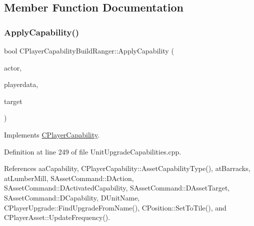 \subsection{Member Function Documentation}
\hypertarget{classCPlayerCapabilityBuildRanger_a113a97c3d833f206d333cb0e2e37aa31}{}\label{classCPlayerCapabilityBuildRanger_a113a97c3d833f206d333cb0e2e37aa31} 
\subsubsection{\texorpdfstring{Apply\+Capability()}{ApplyCapability()}}
{\footnotesize\ttfamily bool C\+Player\+Capability\+Build\+Ranger\+::\+Apply\+Capability (\begin{DoxyParamCaption}\item[{std\+::shared\+\_\+ptr$<$ \hyperlink{classCPlayerAsset}{C\+Player\+Asset} $>$}]{actor,  }\item[{std\+::shared\+\_\+ptr$<$ \hyperlink{classCPlayerData}{C\+Player\+Data} $>$}]{playerdata,  }\item[{std\+::shared\+\_\+ptr$<$ \hyperlink{classCPlayerAsset}{C\+Player\+Asset} $>$}]{target }\end{DoxyParamCaption})\hspace{0.3cm}{\ttfamily [virtual]}}



Implements \hyperlink{classCPlayerCapability_a2ca6fd7fbd9c0178f1cf1d049c63825f}{C\+Player\+Capability}.



Definition at line 249 of file Unit\+Upgrade\+Capabilities.\+cpp.



References aa\+Capability, C\+Player\+Capability\+::\+Asset\+Capability\+Type(), at\+Barracks, at\+Lumber\+Mill, S\+Asset\+Command\+::\+D\+Action, S\+Asset\+Command\+::\+D\+Activated\+Capability, S\+Asset\+Command\+::\+D\+Asset\+Target, S\+Asset\+Command\+::\+D\+Capability, D\+Unit\+Name, C\+Player\+Upgrade\+::\+Find\+Upgrade\+From\+Name(), C\+Position\+::\+Set\+To\+Tile(), and C\+Player\+Asset\+::\+Update\+Frequency().


